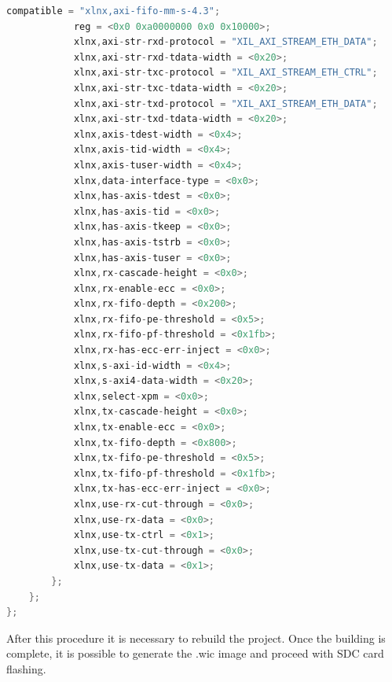 \begin{lstlisting}[language=C]
			compatible = "xlnx,axi-fifo-mm-s-4.3";
			reg = <0x0 0xa0000000 0x0 0x10000>;
			xlnx,axi-str-rxd-protocol = "XIL_AXI_STREAM_ETH_DATA";
			xlnx,axi-str-rxd-tdata-width = <0x20>;
			xlnx,axi-str-txc-protocol = "XIL_AXI_STREAM_ETH_CTRL";
			xlnx,axi-str-txc-tdata-width = <0x20>;
			xlnx,axi-str-txd-protocol = "XIL_AXI_STREAM_ETH_DATA";
			xlnx,axi-str-txd-tdata-width = <0x20>;
			xlnx,axis-tdest-width = <0x4>;
			xlnx,axis-tid-width = <0x4>;
			xlnx,axis-tuser-width = <0x4>;
			xlnx,data-interface-type = <0x0>;
			xlnx,has-axis-tdest = <0x0>;
			xlnx,has-axis-tid = <0x0>;
			xlnx,has-axis-tkeep = <0x0>;
			xlnx,has-axis-tstrb = <0x0>;
			xlnx,has-axis-tuser = <0x0>;
			xlnx,rx-cascade-height = <0x0>;
			xlnx,rx-enable-ecc = <0x0>;
			xlnx,rx-fifo-depth = <0x200>;
			xlnx,rx-fifo-pe-threshold = <0x5>;
			xlnx,rx-fifo-pf-threshold = <0x1fb>;
			xlnx,rx-has-ecc-err-inject = <0x0>;
			xlnx,s-axi-id-width = <0x4>;
			xlnx,s-axi4-data-width = <0x20>;
			xlnx,select-xpm = <0x0>;
			xlnx,tx-cascade-height = <0x0>;
			xlnx,tx-enable-ecc = <0x0>;
			xlnx,tx-fifo-depth = <0x800>;
			xlnx,tx-fifo-pe-threshold = <0x5>;
			xlnx,tx-fifo-pf-threshold = <0x1fb>;
			xlnx,tx-has-ecc-err-inject = <0x0>;
			xlnx,use-rx-cut-through = <0x0>;
			xlnx,use-rx-data = <0x0>;
			xlnx,use-tx-ctrl = <0x1>;
			xlnx,use-tx-cut-through = <0x0>;
			xlnx,use-tx-data = <0x1>;
		};
	};
};
\end{lstlisting}
\vspace{0.1cm}
After this procedure it is necessary to rebuild the project. Once the building is complete, it is possible to generate the .wic image and proceed with SDC card flashing.

